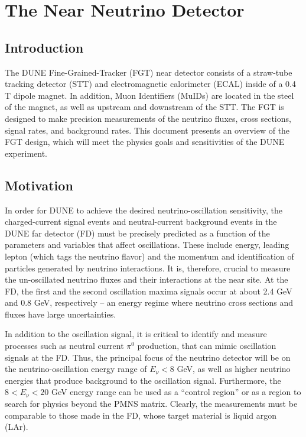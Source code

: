 
\chapter{The Near Neutrino Detector}

\section{Introduction} 

The DUNE Fine-Grained-Tracker (FGT) near detector consists of a straw-tube
tracking detector (STT) and electromagnetic calorimeter (ECAL) inside of a 0.4 T
dipole magnet. In addition, Muon Identifiers (MuIDs) are located in the
steel of the magnet, as well as upstream and downstream of the STT. The FGT
is designed to make precision measurements of the neutrino fluxes, 
cross sections, signal rates, and background rates. 
This document presents an overview of the FGT design, which 
will meet the physics goals and sensitivities of the DUNE experiment. 

\section{Motivation}

In order for DUNE to achieve the desired neutrino-oscillation sensitivity, the 
charged-current signal events
and neutral-current
background events in the DUNE far detector (FD) must be precisely 
predicted as a function of the parameters and variables that affect 
oscillations. These include energy, leading lepton (which tags the neutrino flavor) and the 
momentum and identification of particles generated by neutrino interactions. 
It is, therefore, crucial to measure the un-oscillated neutrino fluxes and 
their interactions at the near site. At the FD, the first and the second 
oscillation maxima signals occur at about 2.4 GeV and 0.8 GeV, respectively 
-- an energy regime where neutrino cross sections and fluxes have large 
uncertainties. 

In addition to the oscillation signal, it is 
critical to identify and measure processes such as neutral current $\pi^0$ production,
that can mimic oscillation signals 
at the FD. Thus, the principal focus of the neutrino detector will be 
on the neutrino-oscillation energy range of $E_\nu < 8$ GeV, as well as higher 
neutrino energies that produce background to the oscillation signal. Furthermore, the
$8<E_\nu < 20$ GeV energy range can be used as a ``control region'' or
as a region
to search for physics beyond the PMNS matrix. Clearly, 
the measurements must be 
comparable to those made in the FD, whose target material is liquid argon (LAr). 

